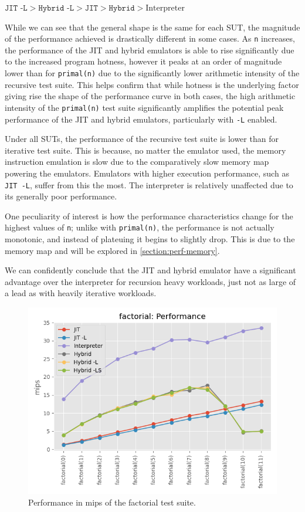 $\texttt{JIT -L} > \texttt{Hybrid -L} > \texttt{JIT} > \texttt{Hybrid} > \text{Interpreter}$

While we can see that the general shape is the same for each SUT, the magnitude of the performance achieved is drastically different in some cases. As \texttt{n} increases, the performance of the JIT and hybrid emulators is able to rise significantly due to the increased program hotness, however it peaks at an order of magnitude lower than for \texttt{primal(n)} due to the significantly lower arithmetic intensity of the recursive test suite. This helps confirm that while hotness is the underlying factor giving rise the shape of the performance curve in both cases, the high arithmetic intensity of the \texttt{primal(n)} test suite significantly amplifies the potential peak performance of the JIT and hybrid emulators, particularly with \texttt{-L} enabled.

Under all SUTs, the performance of the recursive test suite is lower than for iterative test suite. This is because, no matter the emulator used, the memory instruction emulation is slow due to the comparatively slow memory map powering the emulators. Emulators with higher execution performance, such as \texttt{JIT -L}, suffer from this the most. The interpreter is relatively unaffected due to its generally poor performance.

One peculiarity of interest is how the performance characteristics change for the highest values of \texttt{n}; unlike with \texttt{primal(n)}, the performance is not actually monotonic, and instead of plateuing it begins to slightly drop. This is due to the memory map and will be explored in \autoref{section:perf-memory}.

We can confidently conclude that the JIT and hybrid emulator have a significant advantage over the interpreter for recursion heavy workloads, just not as large of a lead as with heavily iterative workloads.


\begin{figure}[H]
    \centering
    \includegraphics[scale=0.75]{output/graphs/tests/all/factorial/mips.png}
    \caption{Performance in mips of the factorial test suite.}
    \label{figure:factorial-mips}
\end{figure}